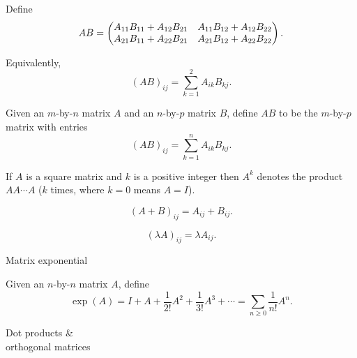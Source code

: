 \documentclass{beamer}
\begin{document}
\begin{frame}
\begin{Definition}\label{dfn:matmul2}
Define \[AB=\begin{pmatrix} A_{11}B_{11}+A_{12}B_{21} &
A_{11}B_{12}+A_{12}B_{22}\\ A_{21}B_{11}+A_{22}B_{21} &
A_{21}B_{12}+A_{22}B_{22}\end{pmatrix}.\]


 Equivalently, \[(AB)_{ij}=\sum_{k=1}^2A_{ik}B_{kj}.\]


\begin{Definition}\label{dfn:matmul}
Given an \(m\)-by-\(n\) matrix \(A\) and an \(n\)-by-\(p\) matrix
\(B\), define \(AB\) to be the \(m\)-by-\(p\) matrix with entries
\[(AB)_{ij}=\sum_{k=1}^nA_{ik}B_{kj}.\]


\end{Definition}
\end{Definition}
\end{frame}
\begin{frame}
\begin{Definition}\label{dfn:matrixpowers}
If \(A\) is a square matrix and \(k\) is a positive integer then
\(A^k\) denotes the product \(AA\cdots A\) (\(k\) times, where
\(k=0\) means \(A=I\)).


\end{Definition}
\begin{Definition}\label{dfn:matrixsum}
\[(A+B)_{ij}=A_{ij}+B_{ij}.\]


\end{Definition}
\begin{Definition}\label{dfn:matrixscaling}
\[(\lambda A)_{ij}=\lambda A_{ij}.\]


\end{Definition}
\end{frame}
\begin{frame}
{Matrix exponential}


\begin{Definition}\label{dfn:matexp}
Given an \(n\)-by-\(n\) matrix \(A\), define
\[\exp(A)=I+A+\frac{1}{2!}A^2+\frac{1}{3!}A^3+\cdots=\sum_{n\geq 0}\frac{1}{n!}A^n.\]


\end{Definition}
\end{frame}
\begin{frame}
\begin{center}
{\huge Dot products \&\\ orthogonal matrices}
\end{center}


\end{frame}
\end{document}
